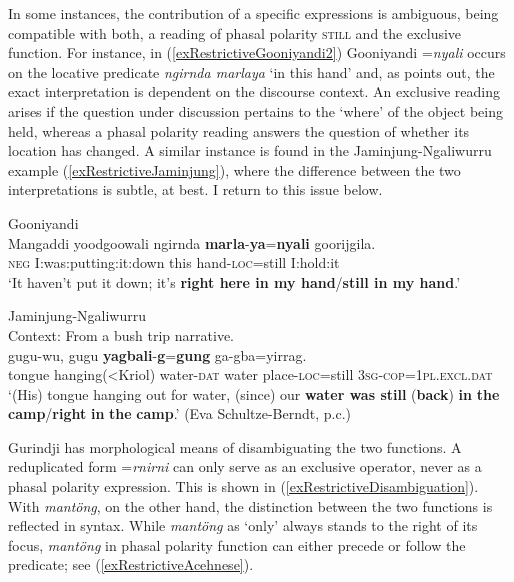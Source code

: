 In some instances, the contribution of a specific expressions is ambiguous, being compatible with both, a reading of phasal polarity \textsc{still} and the exclusive function. For instance, in (\ref{exRestrictiveGooniyandi2}) Gooniyandi \mbox{=\textit{nyali}} occurs on the locative predicate \textit{ngirnda marlaya} \lq in this hand' and, as \textcite[465–466]{McGregor1990} points out, the exact interpretation is dependent on the discourse context. An exclusive reading arises if the question under discussion pertains to the \lq where' of the object being held, whereas a phasal polarity reading answers the question of whether its location has changed. A similar instance is found in the Jaminjung-Ngaliwurru example (\ref{exRestrictiveJaminjung}), where the difference between the two interpretations is subtle, at best. I return to this issue below.

\begin{exe}
	\ex Gooniyandi\label{exRestrictiveGooniyandi2}\\
	\gll Mangaddi yoodgoowali ngirnda \textbf{marla}-\textbf{ya}=\textbf{nyali} goorijgila.\\
	\textsc{neg} I:was:putting:it:down this hand-\textsc{loc}=still I:hold:it\\
	\glt \lq It haven’t put it down; it’s \textbf{right here in my hand}/\textbf{still in my hand}.'  \parencite[465–466]{McGregor1990}
	
	\ex Jaminjung-Ngaliwurru\label{exRestrictiveJaminjung}\\
	Context: From a bush trip narrative.\\
	 gugu-wu, gugu \textbf{yagbali}-\textbf{g}=\textbf{gung} ga-gba=yirrag.\\
	{tongue hanging(<Kriol)} water-\textsc{dat} water place-\textsc{loc}=still 3\textsc{sg}-\textsc{cop}=1\textsc{pl}.\textsc{excl}.\textsc{dat}\\
	\glt \lq (His) tongue hanging out for water, (since) our \textbf{water was still} (\textbf{back}) \textbf{in} \textbf{the} \textbf{camp}/\textbf{right} \textbf{in} \textbf{the} \textbf{camp}.' (Eva Schultze-Berndt, p.c.)
\end{exe}

Gurindji has morphological means of disambiguating the two functions. A reduplicated form \mbox{=\textit{rnirni}} can only serve as an exclusive operator, never as a phasal polarity expression. This is shown in (\ref{exRestrictiveDisambiguation}). 
With  \textit{mantöng}, on the other hand, the distinction between the two functions is reflected in  syntax. While \textit{mantöng} as \lq only\rq{ }always stands to the right of its focus, \textit{mantöng} in phasal polarity function can either precede or follow the predicate; see (\ref{exRestrictiveAcehnese}).

